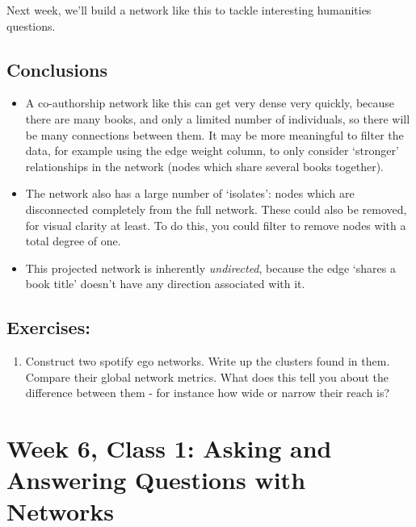\documentclass[
]{book}
\providecommand{\tightlist}{%
  \setlength{\itemsep}{0pt}\setlength{\parskip}{0pt}}
\begin{document}
Next week, we'll build a network like this to tackle interesting humanities questions.

\hypertarget{conclusions-2}{%
\section{Conclusions}\label{conclusions-2}}

\begin{itemize}
\item
  A co-authorship network like this can get very dense very quickly, because there are many books, and only a limited number of individuals, so there will be many connections between them. It may be more meaningful to filter the data, for example using the edge weight column, to only consider `stronger' relationships in the network (nodes which share several books together).
\item
  The network also has a large number of `isolates': nodes which are disconnected completely from the full network. These could also be removed, for visual clarity at least. To do this, you could filter to remove nodes with a total degree of one.
\item
  This projected network is inherently \emph{undirected}, because the edge `shares a book title' doesn't have any direction associated with it.
\end{itemize}

\hypertarget{exercises-2}{%
\section{Exercises:}\label{exercises-2}}

\begin{enumerate}
\def\labelenumi{\alph{enumi})}
\tightlist
\item
  Construct two spotify ego networks. Write up the clusters found in them. Compare their global network metrics. What does this tell you about the difference between them - for instance how wide or narrow their reach is?
\end{enumerate}

\hypertarget{week-6-class-1-asking-and-answering-questions-with-networks}{%
\chapter{Week 6, Class 1: Asking and Answering Questions with Networks}\label{week-6-class-1-asking-and-answering-questions-with-networks}}
\end{document}
